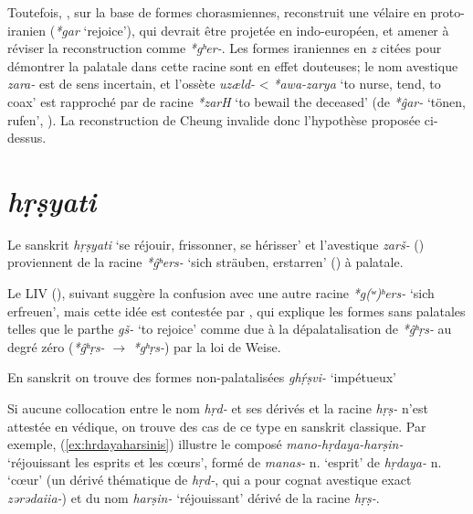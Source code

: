 \documentclass{article}
\newcommand{\ipa}[1]{{\phon\textit{#1}}}
\begin{document}
Toutefois, \citet[104]{cheung07dictionary}, sur la base de formes chorasmiennes, reconstruit une vélaire en proto-iranien (\ipa{*gar} `rejoice'), qui devrait être projetée en indo-européen, et amener à réviser la reconstruction comme \ipa{*gʰer-}. Les formes iraniennes en \ipa{z} citées pour démontrer la palatale dans cette racine sont en effet douteuses; le nom avestique \ipa{zara-} est de sens incertain, et l'ossète \ipa{uzæld-} < \ipa{*awa-zarya} `to nurse, tend, to coax' est rapproché par  \citet[470]{cheung07dictionary} de racine \ipa{*zarH} `to bewail the deceased' (de \ipa{*ĝar-} `tönen, rufen', \citealt[161]{liv}). La reconstruction de Cheung invalide donc l'hypothèse proposée ci-dessus.

\section{\ipa{hṛṣyati}} \label{sec:hrsyati}
Le sanskrit \ipa{hṛṣyati} `se réjouir, frissonner, se hérisser' et l'avestique \ipa{zarš-} (\citealt[471]{cheung07dictionary}) proviennent de la racine \ipa{*ĝʰers-} `sich sträuben, erstarren' (\citealt[178]{liv}) à palatale. 

Le LIV (\citealt[198]{liv}), suivant \citet[808]{mayrhofer92ewa}  suggère la confusion avec une autre racine \ipa{*g(ʷ)ʰers-} `sich erfreuen', mais cette idée est contestée par \citet[471]{cheung07dictionary}, qui explique les formes sans palatales telles que le parthe \ipa{gš-}  `to rejoice' comme due à la dépalatalisation de \ipa{*ĝʰṛs-} au degré zéro (\ipa{*ĝʰṛs-} $\rightarrow$ \ipa{*gʰṛs-}) par la loi de Weise. 

En sanskrit on trouve des formes non-palatalisées \ipa{ghṛ́ṣvi-} `impétueux'  


Si aucune collocation entre le nom \ipa{hṛd-} et ses dérivés et la racine \ipa{hṛṣ-} n'est attestée en védique, on trouve des cas de ce type en sanskrit classique. Par exemple, (\ref{ex:hrdayaharsinis}) illustre le composé \ipa{mano-hṛdaya-harṣin-} `réjouissant les esprits et les cœurs', formé de \ipa{manas-} n. `esprit' de \ipa{hṛdaya-} n. `cœur' (un dérivé thématique de \ipa{hṛd-}, qui a pour cognat avestique exact \ipa{zərədaiia-}) et du nom \ipa{harṣin-} `réjouissant' dérivé de la racine \ipa{hṛṣ-}. 
\end{document}

